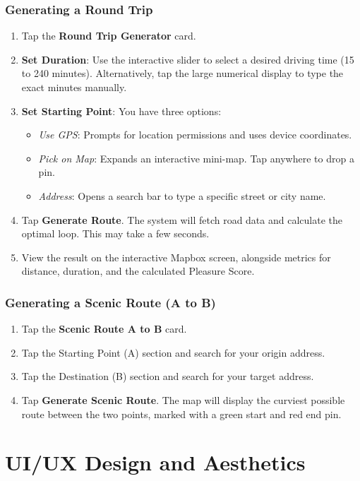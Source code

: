 \documentclass[12pt,a4paper,oneside]{report}
\begin{document}
\subsection{Generating a Round Trip}
\begin{enumerate}
    \item Tap the \textbf{Round Trip Generator} card.
    \item \textbf{Set Duration}: Use the interactive slider to select a desired driving time (15 to 240 minutes). Alternatively, tap the large numerical display to type the exact minutes manually.
    \item \textbf{Set Starting Point}: You have three options:
    \begin{itemize}
        \item \textit{Use GPS}: Prompts for location permissions and uses device coordinates.
        \item \textit{Pick on Map}: Expands an interactive mini-map. Tap anywhere to drop a pin.
        \item \textit{Address}: Opens a search bar to type a specific street or city name.
    \end{itemize}
    \item Tap \textbf{Generate Route}. The system will fetch road data and calculate the optimal loop. This may take a few seconds.
    \item View the result on the interactive Mapbox screen, alongside metrics for distance, duration, and the calculated Pleasure Score.
\end{enumerate}

\subsection{Generating a Scenic Route (A to B)}
\begin{enumerate}
    \item Tap the \textbf{Scenic Route A to B} card.
    \item Tap the Starting Point (A) section and search for your origin address.
    \item Tap the Destination (B) section and search for your target address.
    \item Tap \textbf{Generate Scenic Route}. The map will display the curviest possible route between the two points, marked with a green start and red end pin.
\end{enumerate}

\chapter{UI/UX Design and Aesthetics}
\end{document}
